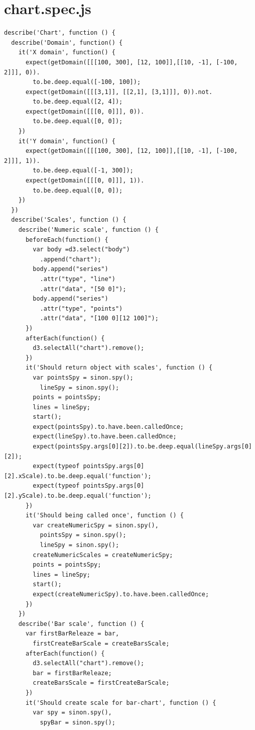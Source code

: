 \documentclass[a4paper,14pt]{extreport}
\begin{document}
\section*{chart.spec.js}
\begin{lstlisting}
describe('Chart', function () {
  describe('Domain', function() {
    it('X domain', function() {
      expect(getDomain([[[100, 300], [12, 100]],[[10, -1], [-100, 2]]], 0)).
        to.be.deep.equal([-100, 100]);
      expect(getDomain([[[3,1]], [[2,1], [3,1]]], 0)).not.
        to.be.deep.equal([2, 4]);
      expect(getDomain([[[0, 0]]], 0)).
        to.be.deep.equal([0, 0]);
    })
    it('Y domain', function() {
      expect(getDomain([[[100, 300], [12, 100]],[[10, -1], [-100, 2]]], 1)).
        to.be.deep.equal([-1, 300]);
      expect(getDomain([[[0, 0]]], 1)).
        to.be.deep.equal([0, 0]);
    })
  })
  describe('Scales', function () {
    describe('Numeric scale', function () {
      beforeEach(function() {
        var body =d3.select("body")
          .append("chart");
        body.append("series")
          .attr("type", "line")
          .attr("data", "[50 0]");
        body.append("series")
          .attr("type", "points")
          .attr("data", "[100 0][12 100]");
      })
      afterEach(function() {
        d3.selectAll("chart").remove();
      })
      it('Should return object with scales', function () {
        var pointsSpy = sinon.spy();
          lineSpy = sinon.spy();
        points = pointsSpy;
        lines = lineSpy;
        start();
        expect(pointsSpy).to.have.been.calledOnce;
        expect(lineSpy).to.have.been.calledOnce;
        expect(pointsSpy.args[0][2]).to.be.deep.equal(lineSpy.args[0][2]);
        expect(typeof pointsSpy.args[0][2].xScale).to.be.deep.equal('function');
        expect(typeof pointsSpy.args[0][2].yScale).to.be.deep.equal('function');
      })
      it('Should being called once', function () {
        var createNumericSpy = sinon.spy(),
          pointsSpy = sinon.spy();
          lineSpy = sinon.spy();
        createNumericScales = createNumericSpy;
        points = pointsSpy;
        lines = lineSpy;
        start();
        expect(createNumericSpy).to.have.been.calledOnce;
      })
    })
    describe('Bar scale', function () {
      var firstBarReleaze = bar,
        firstCreateBarScale = createBarsScale;
      afterEach(function() {
        d3.selectAll("chart").remove();
        bar = firstBarReleaze;
        createBarsScale = firstCreateBarScale;
      })
      it('Should create scale for bar-chart', function () {
        var spy = sinon.spy(),
          spyBar = sinon.spy();

\end{lstlisting}
\end{document}
